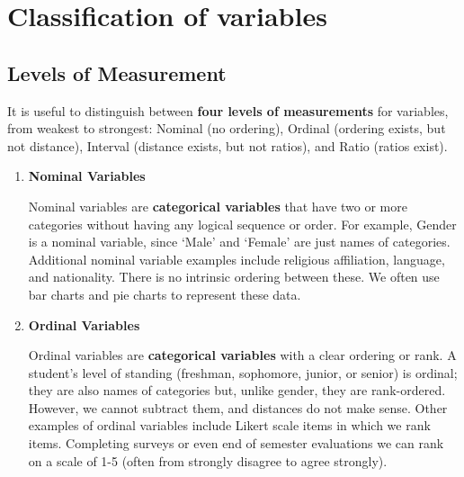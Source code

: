 \documentclass[11pt, chapterprefix=true]{scrbook}\usepackage[]{graphicx}\usepackage[]{color}
\begin{document}
\section{Classification of variables}

\subsection{Levels of Measurement}

It is useful to distinguish between \textbf{four levels of measurements} for variables, from weakest to strongest: Nominal (no ordering), Ordinal (ordering exists, but not distance), Interval (distance exists, but not ratios), and Ratio (ratios exist).

\begin{enumerate}
\item \textbf{Nominal Variables}

Nominal variables are \textbf{categorical variables} that have two or more categories without having any logical sequence or order. For example, Gender is a nominal variable, since `Male' and `Female' are just names of categories.  Additional nominal variable examples include religious affiliation, language, and nationality.   There is no intrinsic ordering between these.  We often use bar charts and pie charts to represent these data.


\item \textbf{Ordinal Variables}

Ordinal variables are \textbf{categorical variables} with a clear ordering or rank.  A student's level of standing (freshman, sophomore, junior, or senior) is ordinal; they are also names of categories but, unlike gender, they are rank-ordered.   However, we cannot subtract them, and distances do not make sense.  Other examples of ordinal variables include Likert scale items in which we rank items.  Completing surveys or even end of semester evaluations we can rank on a scale of 1-5 (often from strongly disagree to agree strongly).


\end{enumerate}
\end{document}

